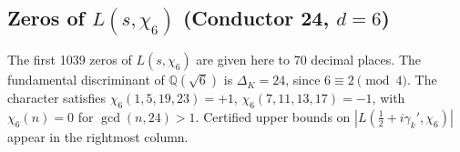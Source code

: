 \documentclass[12pt,reqno]{amsart}
\theoremstyle{remark}
\newcommand{\Q}{\mathbb{Q}}
\begin{document}
\subsection{Zeros of \texorpdfstring{$L(s,\chi_6)$}{L(s,chi6)} (Conductor 24, \texorpdfstring{$d = 6$}{d=6})}
\label{subsec:chi6}

The first 1039 zeros of $L(s,\chi_6)$ are given here to 70 decimal places.  The fundamental discriminant of $\Q(\sqrt{6})$ is $\Delta_K = 24$, since $6 \equiv 2 \pmod{4}$.  The character satisfies $\chi_6(1,5,19,23) = +1$, $\chi_6(7,11,13,17) = -1$, with $\chi_6(n) = 0$ for $\gcd(n,24) > 1$.  Certified upper bounds on $|L(\tfrac{1}{2}+i\gamma_k',\chi_6)|$ appear in the rightmost column.

\renewcommand{\arraystretch}{1.1}
\setlength{\LTleft}{\fill}
\setlength{\LTright}{\fill}
\footnotesize
\end{document}
